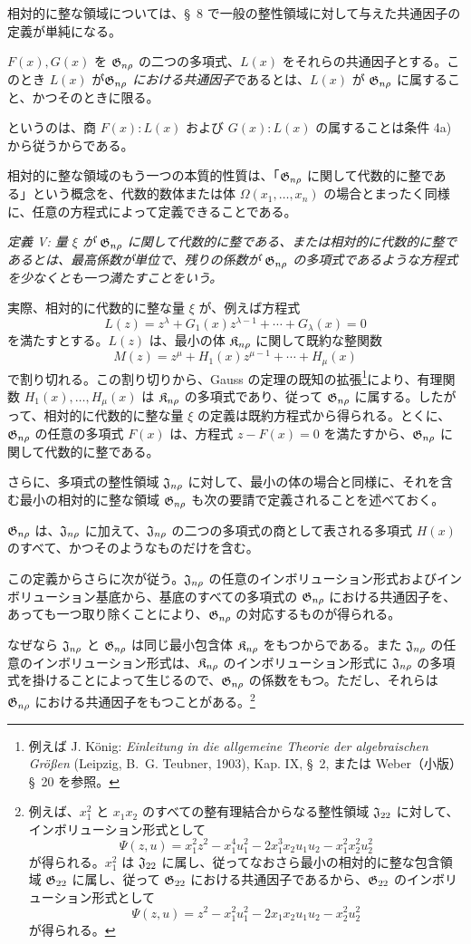 \documentclass[11pt]{jlreq}
\begin{document}
相対的に整な領域については、\S\ 8 で一般の整性領域に対して与えた共通因子の定義が単純になる。

$F(x),G(x)$ を $\mathfrak{G}_{n\rho}$ の二つの多項式、$L(x)$ をそれらの共通因子とする。このとき $L(x)$ が\emph{$\mathfrak{G}_{n\rho}$ における共通因子}であるとは、$L(x)$ が $\mathfrak{G}_{n\rho}$ に属すること、かつそのときに限る。

というのは、商 $F(x):L(x)$ および $G(x):L(x)$ の属することは条件 4a) から従うからである。

相対的に整な領域のもう一つの本質的性質は、「$\mathfrak{G}_{n\rho}$ に関して代数的に整である」という概念を、代数的数体または体 $\Omega(x_1,\ldots,x_n)$ の場合とまったく同様に、任意の方程式によって定義できることである。

\emph{定義 V: 量 $\xi$ が $\mathfrak{G}_{n\rho}$ に関して代数的に整である、または相対的に代数的に整であるとは、最高係数が単位で、残りの係数が $\mathfrak{G}_{n\rho}$ の多項式であるような方程式を少なくとも一つ満たすことをいう。}

実際、相対的に代数的に整な量 $\xi$ が、例えば方程式
\[
  L(z)=z^\lambda+G_1(x)z^{\lambda-1}+\cdots+G_\lambda(x)=0
\]
を満たすとする。$L(z)$ は、最小の体 $\mathfrak{K}_{n\rho}$ に関して既約な整関数
\[
  M(z)=z^\mu+H_1(x)z^{\mu-1}+\cdots+H_\mu(x)
\]
で割り切れる。この割り切りから、Gauss の定理の既知の拡張\footnote{例えば J. König: \emph{Einleitung in die allgemeine Theorie der algebraischen Größen} (Leipzig, B.~G. Teubner, 1903), Kap. IX, \S\ 2, または Weber（小版）\S\ 20 を参照。}により、有理関数 $H_1(x),\ldots,H_\mu(x)$ は $\mathfrak{K}_{n\rho}$ の多項式であり、従って $\mathfrak{G}_{n\rho}$ に属する。したがって、相対的に代数的に整な量 $\xi$ の定義は既約方程式から得られる。とくに、$\mathfrak{G}_{n\rho}$ の任意の多項式 $F(x)$ は、方程式 $z-F(x)=0$ を満たすから、$\mathfrak{G}_{n\rho}$ に関して代数的に整である。

さらに、多項式の整性領域 $\mathfrak{J}_{n\rho}$ に対して、最小の体の場合と同様に、それを含む最小の相対的に整な領域 $\mathfrak{G}_{n\rho}$ も次の要請で定義されることを述べておく。

$\mathfrak{G}_{n\rho}$ は、$\mathfrak{J}_{n\rho}$ に加えて、$\mathfrak{J}_{n\rho}$ の二つの多項式の商として表される多項式 $H(x)$ のすべて、かつそのようなものだけを含む。

この定義からさらに次が従う。$\mathfrak{J}_{n\rho}$ の任意のインボリューション形式およびインボリューション基底から、基底のすべての多項式の $\mathfrak{G}_{n\rho}$ における共通因子を、あっても一つ取り除くことにより、$\mathfrak{G}_{n\rho}$ の対応するものが得られる。

なぜなら $\mathfrak{J}_{n\rho}$ と $\mathfrak{G}_{n\rho}$ は同じ最小包含体 $\mathfrak{K}_{n\rho}$ をもつからである。また $\mathfrak{J}_{n\rho}$ の任意のインボリューション形式は、$\mathfrak{K}_{n\rho}$ のインボリューション形式に $\mathfrak{J}_{n\rho}$ の多項式を掛けることによって生じるので、$\mathfrak{G}_{n\rho}$ の係数をもつ。ただし、それらは $\mathfrak{G}_{n\rho}$ における共通因子をもつことがある。\footnote{例えば、$x_1^2$ と $x_1x_2$ のすべての整有理結合からなる整性領域 $\mathfrak{J}_{22}$ に対して、インボリューション形式として
\[
\Psi(z,u)=x_1^2z^2-x_1^4u_1^2-2x_1^3x_2u_1u_2-x_1^2x_2^2u_2^2
\]
が得られる。$x_1^2$ は $\mathfrak{J}_{22}$ に属し、従ってなおさら最小の相対的に整な包含領域 $\mathfrak{G}_{22}$ に属し、従って $\mathfrak{G}_{22}$ における共通因子であるから、$\mathfrak{G}_{22}$ のインボリューション形式として
\[
\Psi(z,u)=z^2-x_1^2u_1^2-2x_1x_2u_1u_2-x_2^2u_2^2
\]
が得られる。}
\end{document}
